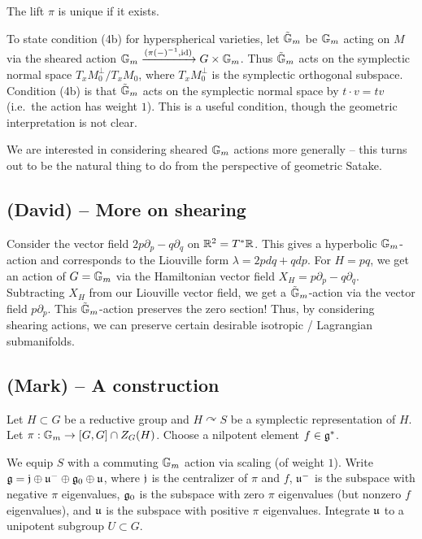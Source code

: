 \documentclass{article}
\begin{document}
\begin{prop}
	The lift $\pi$ is unique if it exists.
\end{prop}

To state condition (4b) for hyperspherical varieties, let $\tilde{\mathbb{G}}_m$ be $\mathbb{G}_m$ acting on $M$ via the sheared action $\mathbb{G}_m \xrightarrow{(\pi(-)^{-1}, \operatorname{id})} G \times \mathbb{G}_m$.
Thus $\tilde{\mathbb{G}}_m$ acts on the symplectic normal space $T_x M_0^\perp / T_x M_0$, where $T_x M_0^\perp$ is the symplectic orthogonal subspace.
Condition (4b) is that $\tilde{\mathbb{G}}_m$ acts on the symplectic normal space by $t \cdot v = tv$ (i.e.\ the action has weight $1$).
This is a useful condition, though the geometric interpretation is not clear.

We are interested in considering sheared $\mathbb{G}_m$ actions more generally -- this turns out to be the natural thing to do from the perspective of geometric Satake.

\subsection{(David) -- More on shearing}

Consider the vector field $2 p \partial_p - q \partial_q$ on $\mathbb{R}^2 = T^*\mathbb{R}$.
This gives a hyperbolic $\mathbb{G}_m$-action and corresponds to the Liouville form $\lambda = 2 p dq + q dp$.
For $H = pq$, we get an action of $G = \mathbb{G}_m$ via the Hamiltonian vector field $X_H = p \partial_p - q \partial_q$.
Subtracting $X_H$ from our Liouville vector field, we get a $\tilde{\mathbb{G}}_m$-action via the vector field $p \partial_p$.
This $\tilde{\mathbb{G}}_m$-action preserves the zero section!
Thus, by considering shearing actions, we can preserve certain desirable isotropic / Lagrangian submanifolds.

\subsection{(Mark) -- A construction}

Let $H \subset G$ be a reductive group and $H \curvearrowright S$ be a symplectic representation of $H$.
Let $\pi: \mathbb{G}_m \to [G, G] \cap Z_G(H)$.
Choose a nilpotent element $f \in \mathfrak{g}^*$.

We equip $S$ with a commuting $\mathbb{G}_m$ action via scaling (of weight $1$).
Write $\mathfrak{g} = \mathfrak{j} \oplus \mathfrak{u}^- \oplus \mathfrak{g}_0 \oplus \mathfrak{u}$, where $\mathfrak{j}$ is the centralizer of $\pi$ and $f$, $\mathfrak{u}^-$ is the subspace with negative $\pi$ eigenvalues, $\mathfrak{g}_0$ is the subspace with zero $\pi$ eigenvalues (but nonzero $f$ eigenvalues), and $\mathfrak{u}$ is the subspace with positive $\pi$ eigenvalues.
Integrate $\mathfrak{u}$ to a unipotent subgroup $U \subset G$.
\end{document}
